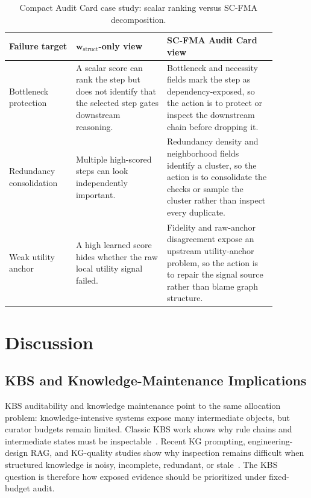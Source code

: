\documentclass[a4paper,fleqn]{cas-sc}
\newcommand{\wstruct}{\ensuremath{\mathbf{w}_{\mathrm{struct}}}}
\begin{document}
\begin{table}[H]
\caption{Compact Audit Card case study: scalar ranking versus SC-FMA decomposition.}
\label{tab:compact-audit-card-case}
\centering
\small
\renewcommand{\arraystretch}{1.08}
\begin{tabular}{Z{0.22\linewidth}Z{0.30\linewidth}Z{0.36\linewidth}}
\toprule
\textbf{Failure target} & \textbf{\wstruct{}-only view} & \textbf{SC-FMA Audit Card view} \\
\midrule
Bottleneck protection & A scalar score can rank the step but does not identify that the selected step gates downstream reasoning. & Bottleneck and necessity fields mark the step as dependency-exposed, so the action is to protect or inspect the downstream chain before dropping it. \\
Redundancy consolidation & Multiple high-scored steps can look independently important. & Redundancy density and neighborhood fields identify a cluster, so the action is to consolidate the checks or sample the cluster rather than inspect every duplicate. \\
Weak utility anchor & A high learned score hides whether the raw local utility signal failed. & Fidelity and raw-anchor disagreement expose an upstream utility-anchor problem, so the action is to repair the signal source rather than blame graph structure. \\
\bottomrule
\end{tabular}
\end{table}

\section{Discussion}
\label{sec:discussion}

\subsection{KBS and Knowledge-Maintenance Implications}
\label{sec:kbs-implications}

KBS auditability and knowledge maintenance point to the same allocation problem: knowledge-intensive systems expose many intermediate objects, but curator budgets remain limited. Classic KBS work shows why rule chains and intermediate states must be inspectable~\cite{buchanan1984mycin,laird2012soar}. Recent KG prompting, engineering-design RAG, and KG-quality studies show why inspection remains difficult when structured knowledge is noisy, incomplete, redundant, or stale~\cite{dai2025llmkg,siddharth2024retrieval,chen2025kgquality}. The KBS question is therefore how exposed evidence should be prioritized under fixed-budget audit.
\end{document}
